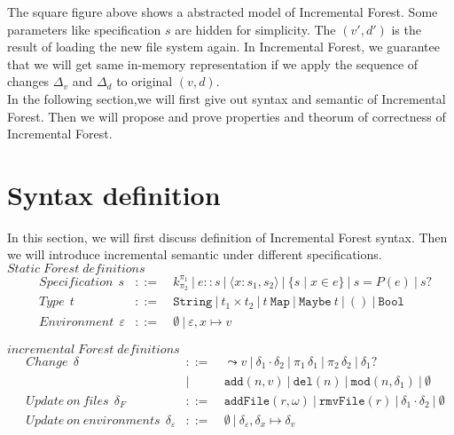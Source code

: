 \documentclass[10pt,twoside,a4paper]{article}
\theoremstyle{theorem}
\theoremstyle{lemma}
\theoremstyle{property}
\theoremstyle{definition}
\theoremstyle{assumption}
\def\fst{\pi_1}
\def\snd{\pi_2}
\begin{document}
The square figure above shows a abstracted model of Incremental Forest. Some parameters like specification $s$ are hidden for simplicity. The $(v',d')$ is the result of loading the new file system again. In Incremental Forest, we guarantee that we will get same in-memory representation if we apply the sequence of changes $\Delta_v$ and $\Delta_d$ to original $(v,d)$.\\

In the following section,we will first give out syntax and semantic of Incremental Forest. Then we will propose and prove properties and theorum of correctness of Incremental Forest.

\newpage

\section{Syntax definition}

In this section, we will first discuss definition of Incremental Forest syntax. Then we will introduce incremental semantic under different specifications.\\

$\boxed{Static\; Forest\; definitions}$
\begin{align*}
	& Specification ~~s	& ::= 	& ~k^{\pi_1}_{\pi_2} ~|~ e::s ~|~ \langle x : s_1, s_2 \rangle ~|~ \{s\mid x\in e\} ~|~ s = P(e) ~|~ s? \\
	& Type ~~t & ::= 	& ~\mathtt{String} ~|~ t_1 \times t_2 ~|~ t~\mathtt{Map} ~|~ \mathtt{Maybe}~t ~|~ \mathtt{()} ~|~ \mathtt{Bool}\\
	& Environment ~~\varepsilon & ::= & ~\emptyset ~|~ \varepsilon, x\mapsto v
\end{align*}

$\boxed{incremental\;Forest\;definitions}$
\begin{align*}
	& Change ~~\delta & ::= 	& ~\leadsto v ~|~ \delta_1 \cdot \delta_2 ~|~ \fst\,\delta_1 ~|~ \snd\,\delta_2 ~|~ \delta_1? \\
	& 		& |		&~ \mathtt{add}(n, v) ~|~ \mathtt{del}(n) ~|~ \mathtt{mod}(n, \delta_1) ~|~ \emptyset\\
	& Update~on~files ~~\delta_F 	& ::= 	& ~\mathtt{addFile}(r,\omega) ~|~ \mathtt{rmvFile}(r) ~|~ \delta_1 \cdot \delta_2 ~|~ \emptyset\\
	& Update~on~environments ~~\delta_\varepsilon & ::= & ~\emptyset ~|~ \delta_\varepsilon, \delta_x \mapsto \delta_v \\
\end{align*}
\end{document}
